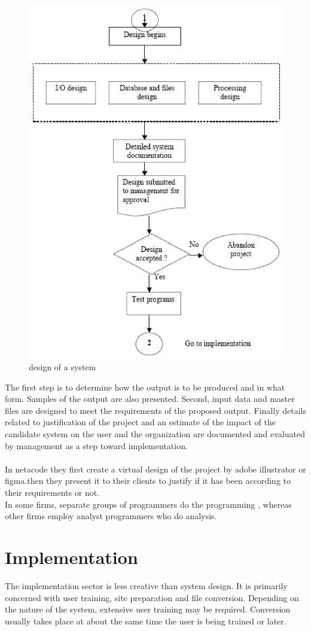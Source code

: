 \documentclass[a4paper,12pt]{report}
\begin{document}
\begin{figure}[h]
	\centering
	\includegraphics[width=0.7\linewidth]{fig-2;chap-2}
	\caption{design of a system}
	\label{fig:fig-2chap-2}
\end{figure}
The first step is to determine how the output is to be produced and in what form. Samples of the output are also presented. Second, input data and master files  are designed to meet the requirements of the proposed output. Finally details related to justification of the project and an estimate of the impact of the candidate system on the user and the organization  are documented and evaluated by management as a step toward implementation.
\\ \\
In netacode they first create a virtual design of the project by adobe illustrator or figma.then they present it to their clients to justify if it has been according to their requirements or not.\\
In some firms, separate groups of programmers do the programming , whereas other firms employ analyst programmers who do analysis.
\section{Implementation}
The implementation sector is less creative than system design. It is primarily concerned with user training, site preparation and file conversion. Depending on the nature of the system, extensive user training may be required. Conversion usually takes place at about the same time the user is being trained or later.\\
\end{document}

